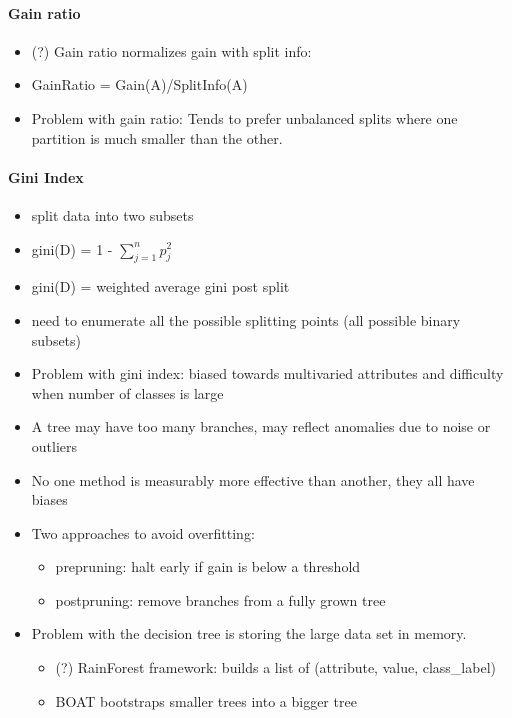 \documentclass[11pt]{article}
\providecommand{\tightlist}{%
      \setlength{\itemsep}{0pt}\setlength{\parskip}{0pt}}
\begin{document}
    \paragraph{Gain ratio}\label{gain-ratio}

    \begin{itemize}
\tightlist
\item
  (?) Gain ratio normalizes gain with split info:
\item
  GainRatio = Gain(A)/SplitInfo(A)
\item
  Problem with gain ratio: Tends to prefer unbalanced splits where one
  partition is much smaller than the other.
\end{itemize}

    \paragraph{Gini Index}\label{gini-index}

    \begin{itemize}
\tightlist
\item
  split data into two subsets
\item
  gini(D) = 1 - \(\sum_{j=1}^np_j^2\)
\item
  gini(D) = weighted average gini post split
\item
  need to enumerate all the possible splitting points (all possible
  binary subsets)
\item
  Problem with gini index: biased towards multivaried attributes and
  difficulty when number of classes is large
\end{itemize}

    \begin{itemize}
\tightlist
\item
  A tree may have too many branches, may reflect anomalies due to noise
  or outliers
\item
  No one method is measurably more effective than another, they all have
  biases
\item
  Two approaches to avoid overfitting:

  \begin{itemize}
  \tightlist
  \item
    prepruning: halt early if gain is below a threshold
  \item
    postpruning: remove branches from a fully grown tree
  \end{itemize}
\item
  Problem with the decision tree is storing the large data set in
  memory.

  \begin{itemize}
  \tightlist
  \item
    (?) RainForest framework: builds a list of (attribute, value,
    class\_label)
  \item
    BOAT bootstraps smaller trees into a bigger tree
  \end{itemize}
\end{itemize}
\end{document}
